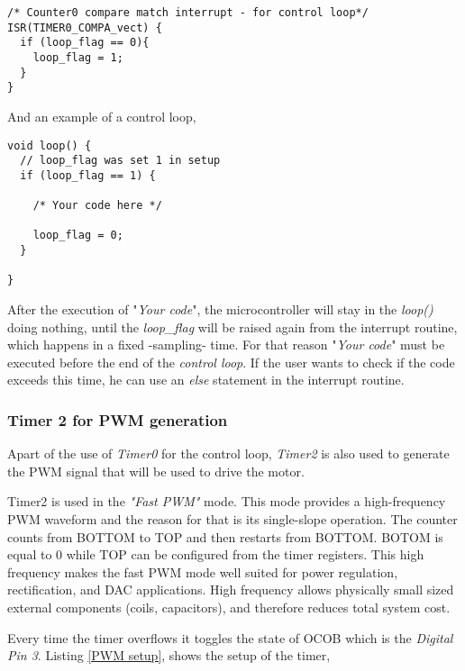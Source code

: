 \begin{lstlisting}[style=My_Arduino, label = Timer0 Interrupt, caption = Timer0 interrupt routine.]
/* Counter0 compare match interrupt - for control loop*/
ISR(TIMER0_COMPA_vect) {
  if (loop_flag == 0){
    loop_flag = 1;
  }
}
\end{lstlisting}


\noindent And an example of a control loop,


\begin{lstlisting}[style=My_Arduino, label = Control loop, caption = Example of control loop]
void loop() {
  // loop_flag was set 1 in setup
  if (loop_flag == 1) {
    
    /* Your code here */
    
    loop_flag = 0;
  }
  
}
\end{lstlisting}


After the execution of "\textit{Your code}", the microcontroller will stay in the \textit{loop()} doing nothing, until the \textit{loop\_flag} will be raised again from the interrupt routine, which happens in a fixed -sampling- time. For that reason "\textit{Your code}" must be executed before the end of the \textit{control loop}. If the user wants to check if the code exceeds this time, he can use an \textit{else} statement in the interrupt routine.

\subsubsection{Timer 2 for PWM generation}

Apart of the use of \textit{Timer0} for the control loop, \textit{Timer2} is also used to generate the PWM signal that will be used to drive the motor.

Timer2 is used in the \textit{"Fast PWM"} mode. This mode provides a high-frequency PWM waveform and the reason for that is its single-slope operation. The counter counts from BOTTOM to TOP and then restarts from BOTTOM. BOTOM is equal to 0 while TOP can be configured from the timer registers. This high frequency makes the fast PWM mode well suited for power regulation, rectification, and DAC applications. High frequency allows physically small sized external components (coils, capacitors), and therefore reduces total system cost.

Every time the timer overflows it toggles the state of OCOB which is the \textit{Digital Pin 3}. Listing \ref{PWM setup}, shows the setup of the timer,


